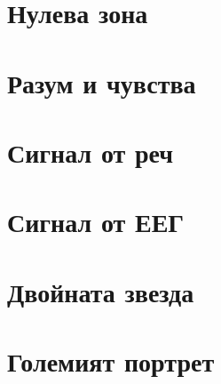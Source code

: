 \chapter*{Нулева зона}

\chapter{Разум и чувства}
\label{chap:emotion}

\chapter{Сигнал от реч}
\label{chap:speech}
    
    
    
    
    
    
\chapter{Сигнал от ЕЕГ}
\label{chap:eeg}
    
    
    
    
\chapter{Двойната звезда}
\label{chap:double}
    
\chapter*{Големият портрет}
\label{conclusion}
    
\begin{appendices}
    
    
    
    
    
\end{appendices}
\printbibliography[heading=bibintoc]